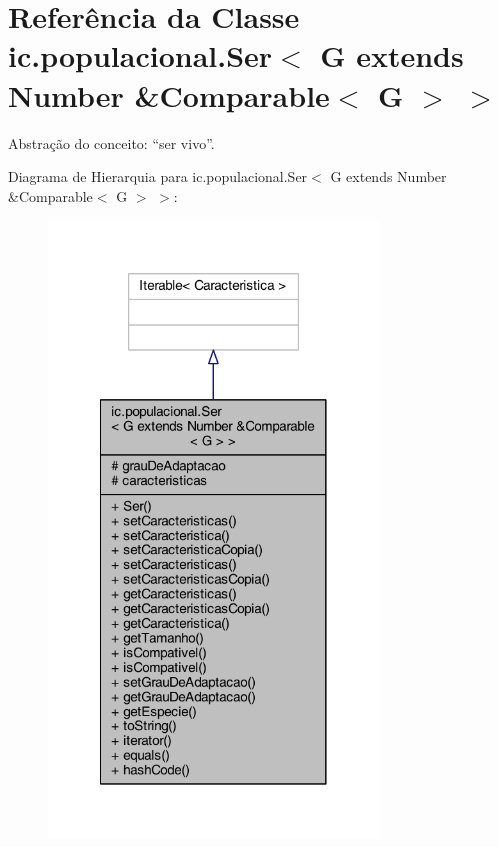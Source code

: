 \hypertarget{classic_1_1populacional_1_1_ser_3_01_g_01extends_01_number_01_6_comparable_3_01_g_01_4_01_4}{\section{Referência da Classe ic.\-populacional.\-Ser$<$ G extends Number \&Comparable$<$ G $>$ $>$}
\label{classic_1_1populacional_1_1_ser_3_01_g_01extends_01_number_01_6_comparable_3_01_g_01_4_01_4}
}


Abstração do conceito\-: “ser vivo”.  




Diagrama de Hierarquia para ic.\-populacional.\-Ser$<$ G extends Number \&Comparable$<$ G $>$ $>$\-:
\nopagebreak
\begin{figure}[H]
\begin{center}
\leavevmode
\includegraphics[width=248pt]{classic_1_1populacional_1_1_ser_3_01_g_01extends_01_number_01_6_comparable_3_01_g_01_4_01_4__inherit__graph}
\end{center}
\end{figure}


